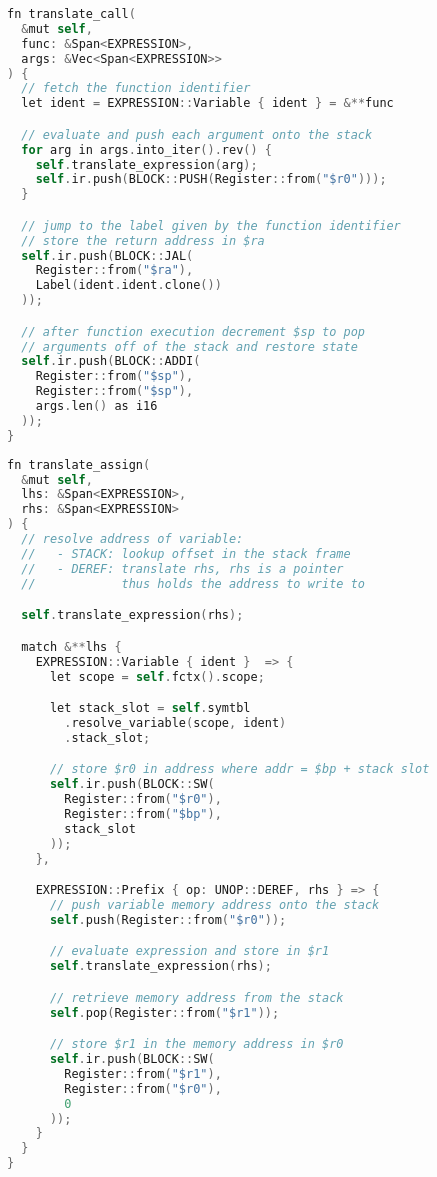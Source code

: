 \begin{lstlisting}[language=C]
fn translate_call(
  &mut self, 
  func: &Span<EXPRESSION>, 
  args: &Vec<Span<EXPRESSION>>
) {
  // fetch the function identifier
  let ident = EXPRESSION::Variable { ident } = &**func 

  // evaluate and push each argument onto the stack 
  for arg in args.into_iter().rev() {
    self.translate_expression(arg);
    self.ir.push(BLOCK::PUSH(Register::from("$r0")));
  }

  // jump to the label given by the function identifier
  // store the return address in $ra
  self.ir.push(BLOCK::JAL(
    Register::from("$ra"), 
    Label(ident.ident.clone())
  ));

  // after function execution decrement $sp to pop 
  // arguments off of the stack and restore state
  self.ir.push(BLOCK::ADDI(
    Register::from("$sp"), 
    Register::from("$sp"), 
    args.len() as i16
  ));
}
\end{lstlisting}

\begin{lstlisting}[language=C]
fn translate_assign(
  &mut self, 
  lhs: &Span<EXPRESSION>, 
  rhs: &Span<EXPRESSION>
) {
  // resolve address of variable:
  //   - STACK: lookup offset in the stack frame
  //   - DEREF: translate rhs, rhs is a pointer 
  //            thus holds the address to write to

  self.translate_expression(rhs);

  match &**lhs {
    EXPRESSION::Variable { ident }  => {
      let scope = self.fctx().scope;

      let stack_slot = self.symtbl
        .resolve_variable(scope, ident)
        .stack_slot;

      // store $r0 in address where addr = $bp + stack slot
      self.ir.push(BLOCK::SW(
        Register::from("$r0"), 
        Register::from("$bp"), 
        stack_slot
      ));
    },

    EXPRESSION::Prefix { op: UNOP::DEREF, rhs } => {
      // push variable memory address onto the stack 
      self.push(Register::from("$r0"));

      // evaluate expression and store in $r1
      self.translate_expression(rhs);

      // retrieve memory address from the stack
      self.pop(Register::from("$r1"));

      // store $r1 in the memory address in $r0
      self.ir.push(BLOCK::SW(
        Register::from("$r1"),
        Register::from("$r0"), 
        0
      ));
    }
  }
}
\end{lstlisting}